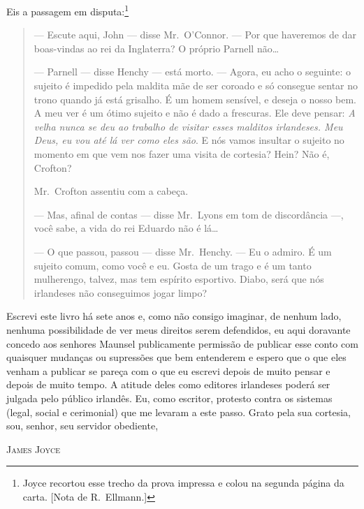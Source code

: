 Eis a passagem em disputa:\footnote{ Joyce recortou esse trecho da prova impressa e colou na segunda página da carta. 
[Nota de R.~Ellmann.]}

\begin{quote}\normalsize
--- Escute aqui, John --- disse Mr.~O’Connor.  --- Por que haveremos de dar
boas-vindas ao rei da Inglaterra? O próprio Parnell não\ldots{}

--- Parnell --- disse Henchy --- está morto.  --- Agora, eu acho o seguinte: o
sujeito é impedido pela maldita mãe de ser coroado e só consegue sentar no
trono quando já está grisalho.  É um homem sensível, e deseja o nosso bem.  A
meu ver é um ótimo sujeito e não é dado a frescuras.  Ele deve pensar:
\textit{A velha nunca se deu ao trabalho de visitar esses malditos irlandeses.
Meu Deus, eu vou até lá ver como eles são}.  E nós vamos insultar o
sujeito no momento em que vem nos fazer uma visita de cortesia?  Hein?  Não é,
Crofton?

Mr.~Crofton assentiu com a cabeça.

--- Mas, afinal de contas --- disse Mr.~Lyons em tom de discordância ---, você
sabe, a vida do rei Eduardo não é lá\ldots{}

--- O que passou, passou --- disse Mr.~Henchy.  --- Eu o admiro.  É um sujeito
comum, como você e eu.  Gosta de um trago e é um tanto mulherengo, talvez, mas
tem espírito esportivo.  Diabo, será que nós irlandeses não conseguimos jogar limpo?
\end{quote}

Escrevi este livro há sete anos e, como não consigo imaginar, de nenhum lado,
nenhuma possibilidade de ver meus direitos serem defendidos, eu aqui doravante
concedo aos senhores Maunsel publicamente permissão de publicar esse conto com
quaisquer mudanças ou supressões que bem entenderem e espero que o que eles
venham a publicar se pareça com o que eu escrevi depois de muito pensar e depois
de muito tempo. A atitude deles como editores irlandeses poderá ser julgada pelo
público irlandês. Eu, como escritor, protesto contra os sistemas (legal, social
e cerimonial) que me levaram a este passo. Grato pela sua cortesia, sou, senhor,
seu servidor obediente, 

{\raggedleft\scshape
James Joyce
\par}


\clearpage

\openany


